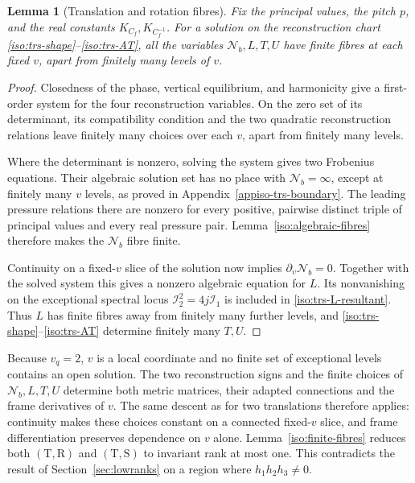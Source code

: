 \documentclass[11pt,a4paper]{article}
\numberwithin{equation}{section}
\theoremstyle{plain}
\newtheorem{lemma}[theorem]{Lemma}
\theoremstyle{definition}
\theoremstyle{remark}
\begin{document}
\begin{lemma}[Translation and rotation fibres]\label{iso:trs-fibres}
Fix the principal values, the pitch $p$, and the real constants $K_{C_f},K_{C_f^{-1}}$.
For a solution on the reconstruction chart
\eqref{iso:trs-shape}--\eqref{iso:trs-AT}, all the variables $\mathcal N_b,L,T,U$ have finite fibres at each fixed $v$,
apart from finitely many levels of $v$.
\end{lemma}
\begin{proof}
Closedness of the phase, vertical equilibrium, and harmonicity give
a first-order system for the four reconstruction variables. On the
zero set of its determinant, its compatibility condition and the two
quadratic reconstruction relations leave finitely many choices over
each $v$, apart from finitely many levels.

Where the determinant is nonzero, solving the system gives two
Frobenius equations. Their algebraic solution set has no place with
$\mathcal N_b=\infty$, except at finitely many $v$ levels, as proved in
Appendix~\ref{appiso-trs-boundary}. The leading pressure relations there
are nonzero for every positive, pairwise distinct triple of principal
values and every real pressure pair. Lemma~\ref{iso:algebraic-fibres}
therefore makes the $\mathcal N_b$ fibre finite.

Continuity on a fixed-$v$ slice of the solution now implies
$\partial_\upsilon\mathcal N_b=0$. Together with the solved system this
gives a nonzero algebraic equation for $L$. Its nonvanishing on the
exceptional spectral locus $\mathcal I_2^2=4j\mathcal I_1$ is included
in \eqref{iso:trs-L-resultant}. Thus $L$ has finite fibres away from
finitely many further levels, and \eqref{iso:trs-shape}--\eqref{iso:trs-AT}
determine finitely many $T,U$.
\end{proof}

Because $v_q=2$, $v$ is a local coordinate and no finite set of
exceptional levels contains an open solution.  The two reconstruction
signs and the finite choices of $\mathcal N_b,L,T,U$ determine both metric matrices,
their adapted connections and the frame derivatives of $v$.
The same descent as for two translations therefore applies: continuity
makes these choices constant on a connected fixed-$v$ slice, and frame
differentiation preserves dependence on $v$ alone.
Lemma~\ref{iso:finite-fibres} reduces both
$(\mathrm{T},\mathrm{R})$ and $(\mathrm{T},\mathrm{S})$ to invariant rank at most one. This contradicts
the result of Section~\ref{sec:lowranks} on a region where
$h_1h_2h_3\ne0$.
\end{document}
